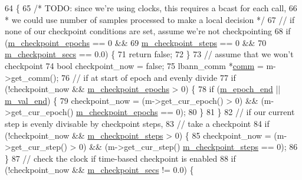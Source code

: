\begin{DoxyCode}
64                                                         \{
65   \textcolor{comment}{/* TODO: since we're using clocks, this requires a bcast for each call,}
66 \textcolor{comment}{   * we could use number of samples processed to make a local decision */}
67   \textcolor{comment}{// if none of our checkpoint conditions are set, assume we're not checkpointing}
68   \textcolor{keywordflow}{if} (\hyperlink{classlbann_1_1lbann__callback__checkpoint_ad6f4399effadedb26e33fc39a3c6915e}{m\_checkpoint\_epochs} == 0 &&
69       \hyperlink{classlbann_1_1lbann__callback__checkpoint_ad6debea7d9bbebd3ee0323acec11516f}{m\_checkpoint\_steps}  == 0 &&
70       \hyperlink{classlbann_1_1lbann__callback__checkpoint_a285658a96f8546952c9016ef4cc12161}{m\_checkpoint\_secs}   == 0.0) \{
71     \textcolor{keywordflow}{return} \textcolor{keyword}{false};
72   \}
73   \textcolor{comment}{// assume that we won't checkpoint}
74   \textcolor{keywordtype}{bool} checkpoint\_now = \textcolor{keyword}{false};
75   lbann\_comm *\hyperlink{file__io_8cpp_ab048c6f9fcbcfaa57ce68b00263dbebe}{comm} = m->get\_comm();
76   \textcolor{comment}{// if at start of epoch and evenly divide}
77   \textcolor{keywordflow}{if} (!checkpoint\_now && \hyperlink{classlbann_1_1lbann__callback__checkpoint_ad6f4399effadedb26e33fc39a3c6915e}{m\_checkpoint\_epochs} > 0) \{
78     \textcolor{keywordflow}{if} (\hyperlink{classlbann_1_1lbann__callback__checkpoint_a9632d5f0078d3ff2015e96dba789e15c}{m\_epoch\_end} || \hyperlink{classlbann_1_1lbann__callback__checkpoint_a3827e5bb569f80d790c3ac856a7c39b5}{m\_val\_end}) \{
79       checkpoint\_now = (m->get\_cur\_epoch() > 0) && (m->get\_cur\_epoch() %
      \hyperlink{classlbann_1_1lbann__callback__checkpoint_ad6f4399effadedb26e33fc39a3c6915e}{m\_checkpoint\_epochs} == 0);
80     \}
81   \}
82   \textcolor{comment}{// if our current step is evenly divisable by checkpoint steps,}
83   \textcolor{comment}{// take a checkpoint}
84   \textcolor{keywordflow}{if} (!checkpoint\_now && \hyperlink{classlbann_1_1lbann__callback__checkpoint_ad6debea7d9bbebd3ee0323acec11516f}{m\_checkpoint\_steps} > 0) \{
85     checkpoint\_now = (m->get\_cur\_step() > 0) && (m->get\_cur\_step() %
      \hyperlink{classlbann_1_1lbann__callback__checkpoint_ad6debea7d9bbebd3ee0323acec11516f}{m\_checkpoint\_steps} == 0);
86   \}
87   \textcolor{comment}{// check the clock if time-based checkpoint is enabled}
88   \textcolor{keywordflow}{if} (!checkpoint\_now && \hyperlink{classlbann_1_1lbann__callback__checkpoint_a285658a96f8546952c9016ef4cc12161}{m\_checkpoint\_secs} != 0.0) \{

\end{DoxyCode}
